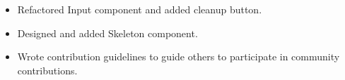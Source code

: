 \documentclass{resume}
\newcommand{\en}[1]{#1}
\newcommand{\zh}[1]{}
\begin{document}
\begin{itemize}
      \item \en{Refactored Input component and added cleanup button.}
            \zh{重构了 Input 组件，添加清理按钮。}
      \item \en{Designed and added Skeleton component.}
            \zh{设计并添加了 Skeleton 组件。}
      \item \en{Wrote contribution guidelines to guide others to participate in community contributions.}
            \zh{编写了贡献指南，引导其他人参与社区贡献。}
\end{itemize}
\end{document}
